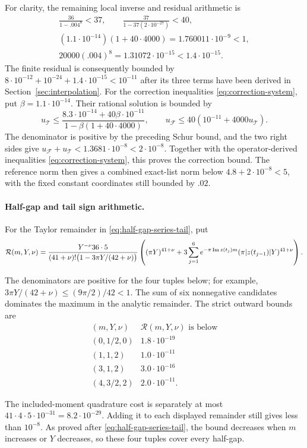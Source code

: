 For clarity, the remaining local inverse and residual arithmetic is
\[
\begin{gathered}
 \frac{36}{1-.004^8}<37,\qquad
 \frac{37}{1-37(2\cdot10^{-27})}<40,\\
 (1.1\cdot10^{-14})(1+40\cdot4000)
 =1.760011\cdot10^{-9}<1,\\
 20000(.004)^8=1.31072\cdot10^{-15}<1.4\cdot10^{-15}.
\end{gathered}
\]
The finite residual is consequently bounded by
$8\cdot10^{-12}+10^{-24}+1.4\cdot10^{-15}<10^{-11}$ after its three
terms have been derived in Section~\ref{sec:interpolation}.
For the correction inequalities \eqref{eq:correction-system}, put
$\beta=1.1\cdot10^{-14}$.  Their rational solution is bounded by
\[
 u_{\mathcal T}\le
 \frac{8.3\cdot10^{-14}+40\beta\cdot10^{-11}}
 {1-\beta(1+40\cdot4000)},\qquad
 u_{\mathcal F}\le40(10^{-11}+4000u_{\mathcal T}).
\]
The denominator is positive by the preceding Schur bound, and the two
right sides give
$u_{\mathcal F}+u_{\mathcal T}<1.3681\cdot10^{-8}<2\cdot10^{-8}$.
Together with the operator-derived inequalities
\eqref{eq:correction-system}, this proves the correction bound.  The
reference norm then gives a combined
exact-list norm below $4.8+2\cdot10^{-8}<5$, with the fixed constant
coordinates still bounded by $.02$.

\paragraph{Half-gap and tail sign arithmetic.}
For the Taylor remainder in \eqref{eq:half-gap-series-tail}, put
\[
 \mathcal R(m,Y,\nu)=
 \frac{Y^{-\nu}36\cdot5}
 {(41+\nu)!\bigl(1-3\pi Y/(42+\nu)\bigr)}
 \left((\pi Y)^{41+\nu}
 +3\sum_{j=1}^6e^{-\pi\operatorname{Im} z(t_j)m}
       (\pi|z(t_{j-1})|Y)^{41+\nu}\right).
\]
\begin{samepage}
The denominators are positive for the four tuples below; for example,
$3\pi Y/(42+\nu)\le(9\pi/2)/42<1$.  The sum of six nonnegative
candidates dominates the maximum in the analytic remainder.  The strict
outward bounds are
\[
\begin{array}{c|c}
(m,Y,\nu)&\mathcal R(m,Y,\nu)\text{ is below}\\ \hline
(0,1/2,0)&1.8\cdot10^{-19}\\
(1,1,2)&1.0\cdot10^{-11}\\
(3,1,2)&3.0\cdot10^{-16}\\
(4,3/2,2)&2.0\cdot10^{-11}.
\end{array}
\]
\end{samepage}
The included-moment quadrature cost is separately at most
$41\cdot4\cdot5\cdot10^{-31}=8.2\cdot10^{-29}$.
Adding it to each displayed remainder still gives less than $10^{-8}$.
As proved after \eqref{eq:half-gap-series-tail}, the bound decreases when
$m$ increases or $Y$ decreases, so these four tuples cover every half-gap.

